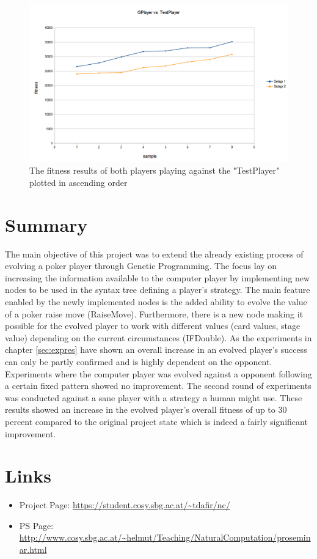 \documentclass[12pt,fleqn,a4paper]{article}
\begin{document}
\begin{figure}[!h]
	\begin{center}
		\includegraphics[width=.7\textwidth]{gp_vs_tp_new.png}
		\caption{The fitness results of both players playing against the "TestPlayer" plotted in ascending order}
	\end{center}
\end{figure}

\section{Summary}
The main objective of this project was to extend the already existing process of evolving a poker player through Genetic Programming. The focus lay on increasing the information available to the computer player by implementing new nodes to be used in the syntax tree defining a player's strategy. The main feature enabled by the newly implemented nodes is the added ability to evolve the value of a poker raise move (RaiseMove). Furthermore, there is a new node making it possible for the evolved player to work with different values (card values, stage value) depending on the current circumstances (IFDouble).
As the experiments in chapter \ref{sec:expres} have shown an overall increase in an evolved player's success can only be partly confirmed and is highly dependent on the opponent. Experiments where the computer player was evolved against a opponent following a certain fixed pattern showed no improvement. The second round of experiments was conducted against a sane player with a strategy a human might use. These results showed an increase in the evolved player's overall fitness of up to 30 percent compared to the original project state which is indeed a fairly significant improvement.


\newpage
\section{Links}

\begin{itemize}
\item Project Page: \url{https://student.cosy.sbg.ac.at/~tdafir/nc/}
\item PS Page:
\url{http://www.cosy.sbg.ac.at/~helmut/Teaching/NaturalComputation/proseminar.html}

\end{itemize}

\nocite{*}

\end{document}
